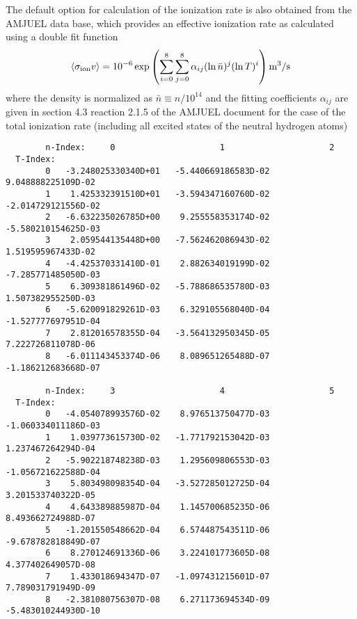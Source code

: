 \documentclass[amsmath,amssymb,a4]{revtex4}
\begin{document}
The default option for calculation of the ionization rate is also obtained from the AMJUEL data base, which provides an effective ionization rate as calculated using a double fit function
\begin{equation}\label{ionization_AMJUEL}
    \langle\sigma_{\rm ion} v\rangle = 10^{-6} \exp\left( \sum_{i=0}^8\sum_{j=0}^8 \alpha_{ij} (\ln \bar n)^j (\ln T)^i \right)  {\rm m}^3/{\rm s}
\end{equation}
where the density is normalized as $\bar n \equiv n / 10^{14}$ and the fitting coefficients $\alpha_{ij}$ are given in section 4.3 reaction 2.1.5 of the AMJUEL document for the case of the total ionization rate (including all excited states of the neutral hydrogen atoms)
\begin{small}\begin{verbatim}
        n-Index:     0                     1                     2
  T-Index:
        0   -3.248025330340D+01   -5.440669186583D-02    9.048888225109D-02
        1    1.425332391510D+01   -3.594347160760D-02   -2.014729121556D-02
        2   -6.632235026785D+00    9.255558353174D-02   -5.580210154625D-03
        3    2.059544135448D+00   -7.562462086943D-02    1.519595967433D-02
        4   -4.425370331410D-01    2.882634019199D-02   -7.285771485050D-03
        5    6.309381861496D-02   -5.788686535780D-03    1.507382955250D-03
        6   -5.620091829261D-03    6.329105568040D-04   -1.527777697951D-04
        7    2.812016578355D-04   -3.564132950345D-05    7.222726811078D-06
        8   -6.011143453374D-06    8.089651265488D-07   -1.186212683668D-07

        n-Index:     3                     4                     5
  T-Index:
        0   -4.054078993576D-02    8.976513750477D-03   -1.060334011186D-03
        1    1.039773615730D-02   -1.771792153042D-03    1.237467264294D-04
        2   -5.902218748238D-03    1.295609806553D-03   -1.056721622588D-04
        3    5.803498098354D-04   -3.527285012725D-04    3.201533740322D-05
        4    4.643389885987D-04    1.145700685235D-06    8.493662724988D-07
        5   -1.201550548662D-04    6.574487543511D-06   -9.678782818849D-07
        6    8.270124691336D-06    3.224101773605D-08    4.377402649057D-08
        7    1.433018694347D-07   -1.097431215601D-07    7.789031791949D-09
        8   -2.381080756307D-08    6.271173694534D-09   -5.483010244930D-10


\end{verbatim}
\end{small}
\end{document}
